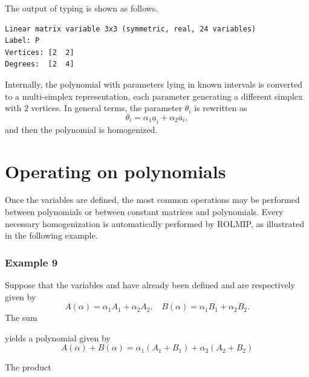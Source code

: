 \documentclass[english,11pt]{article}
\theoremstyle{break} \theorembodyfont{\small\rm}
\begin{document}
The output of typing  is shown as follows.

\begin{minipage}{13.5cm}
\begin{lstlisting}[rulecolor=\color{red}]
Linear matrix variable 3x3 (symmetric, real, 24 variables)
Label: P
Vertices: [2  2]
Degrees:  [2  4]
\end{lstlisting}
\end{minipage}
\vspace{0.2cm}


Internally, the polynomial with parameters lying in known intervals is converted to a multi-simplex representation,
each parameter generating a different simplex with $2$ vertices. In general terms, the parameter $\theta_i$ is rewritten as
\[
 \theta_i = \alpha_1 \underline{a}_i + \alpha_2 \overline{a}_i,
\]
and then the polynomial is homogenized.





\section{Operating on polynomials}\label{sec_parser_poly}

Once the  variables are defined, the most common operations may be performed between
polynomials or between constant matrices and polynomials. Every necessary homogenization is automatically
performed by ROLMIP, as illustrated in the following example.

\subsubsection*{Example 9}
Suppose that the  variables  and  have already been defined and
are respectively given by
\[
 A(\alpha) = \alpha_1 A_1 + \alpha_2 A_2, ~ ~ ~ ~  B(\alpha) = \alpha_1 B_1 + \alpha_2 B_2.
\]
The sum

\noindent\begin{minipage}{\linewidth}
\end{minipage}

yields a polynomial given by
\[
 A(\alpha) + B(\alpha) = \alpha_1 (A_1 + B_1) + \alpha_2 (A_2 + B_2)
\]

The product

\noindent\begin{minipage}{\linewidth}
\end{minipage}
\end{document}
